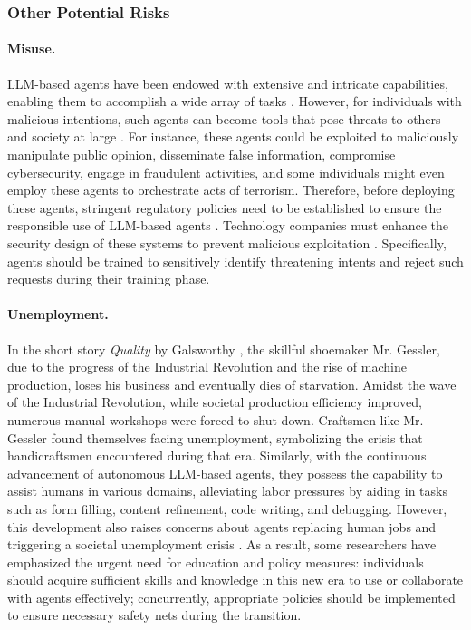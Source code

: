 \subsubsection{Other Potential Risks}

\paragraph{Misuse.}
LLM-based agents have been endowed with extensive and intricate capabilities, enabling them to accomplish a wide array of tasks \cite{gravitasauto, Chase-LangChain-2022}. 
However, for individuals with malicious intentions, such agents can become tools that pose threats to others and society at large \cite{DBLP:journals/corr/abs-1802-07228,DBLP:journals/corr/abs-2108-07258,DBLP:journals/corr/abs-2305-15336}. 
For instance, these agents could be exploited to maliciously manipulate public opinion, disseminate false information, compromise cybersecurity, engage in fraudulent activities, and some individuals might even employ these agents to orchestrate acts of terrorism. 
Therefore, before deploying these agents, stringent regulatory policies need to be established to ensure the responsible use of LLM-based agents \cite{DBLP:journals/corr/abs-2212-08073,DBLP:journals/corr/abs-2103-04044}. 
Technology companies must enhance the security design of these systems to prevent malicious exploitation \cite{DBLP:journals/corr/abs-2209-07858}. 
Specifically, agents should be trained to sensitively identify threatening intents and reject such requests during their training phase.


\paragraph{Unemployment.}
In the short story \textit{Quality} by Galsworthy \cite{galsworthy1912inn}, the skillful shoemaker Mr. Gessler, due to the progress of the Industrial Revolution and the rise of machine production, loses his business and eventually dies of starvation. Amidst the wave of the Industrial Revolution, while societal production efficiency improved, numerous manual workshops were forced to shut down. Craftsmen like Mr. Gessler found themselves facing unemployment, symbolizing the crisis that handicraftsmen encountered during that era.
Similarly, with the continuous advancement of autonomous LLM-based agents, they possess the capability to assist humans in various domains, alleviating labor pressures by aiding in tasks such as form filling, content refinement, code writing, and debugging. 
However, this development also raises concerns about agents replacing human jobs and triggering a societal unemployment crisis \cite{yao2023impact}. 
As a result, some researchers have emphasized the urgent need for education and policy measures: individuals should acquire sufficient skills and knowledge in this new era to use or collaborate with agents effectively; concurrently, appropriate policies should be implemented to ensure necessary safety nets during the transition.


